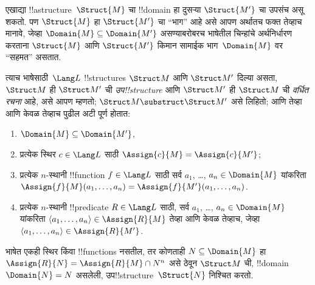\documentclass[../../../include/open-logic-section]{subfiles}
\begin{document}

एखाद्या !!a{structure}~$\Struct{M}$ चा !!{domain} हा दुसऱ्या
$\Struct{M'}$ चा उपसंच असू शकतो. पण $\Struct{M}$ हा $\Struct{M'}$ चा
``भाग'' आहे असे आपण अर्थातच फक्त तेव्हाच मानावे, जेव्हा $\Domain{M}
\subseteq \Domain{M'}$ असण्याबरोबरच भाषेतील चिन्हांचे अर्थनिर्धारण करताना
$\Struct{M}$ आणि $\Struct{M'}$ किमान सामाईक भाग~$\Domain{M}$ वर
``सहमत'' असतात.

\begin{defn}
त्याच भाषेसाठी~$\Lang L$ !!{structure}s $\Struct M$ आणि
$\Struct M'$ दिल्या असता, $\Struct M$ ही $\Struct M'$ ची
\emph{उप!!{structure}} आणि $\Struct M'$ ही $\Struct M$ ची
\emph{वर्धित रचना} आहे, असे आपण म्हणतो; $\Struct M \substruct \Struct M'$
असे लिहितो; आणि तेव्हा आणि केवळ तेव्हाच पुढील अटी पूर्ण होतात:
\begin{enumerate}
\item $\Domain{M} \subseteq \Domain{M'}$,
\item प्रत्येक स्थिर $c \in \Lang L$ साठी $\Assign{c}{M} =
    \Assign{c}{M'}$;
\item प्रत्येक $n$-स्थानी !!{function} $f \in \Lang L$ साठी
  सर्व $a_1$, \dots, $a_n \in \Domain{M}$ यांकरिता
  $\Assign{f}{M}(a_1, \dots, a_n) = \Assign{f}{M'}(a_1, \dots, a_n)$.
\item प्रत्येक $n$-स्थानी !!{predicate} $R \in \Lang L$ साठी, सर्व
  $a_1$, \dots, $a_n \in \Domain{M}$ यांकरिता $\langle
  a_1, \dots, a_n\rangle \in \Assign{R}{M}$ तेव्हा आणि केवळ तेव्हाच,
  जेव्हा $\langle a_1, \dots, a_n\rangle \in \Assign{R}{M'}$.
\end{enumerate}
\end{defn}

\begin{rem}
भाषेत एकही स्थिर किंवा !!{function}s नसतील, तर कोणताही $N
\subseteq \Domain{M}$ हा $\Assign{R}{N} = \Assign{R}{M} \cap N^n$
असे ठेवून $\Struct M$ ची, !!{domain}~$\Domain{N} = N$ असलेली,
उप!!{structure}~$\Struct{N}$ निश्चित करतो.
\end{rem}

\end{document}
